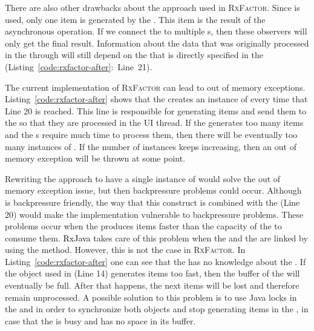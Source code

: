 \documentclass[type=bsc,accentcolor=tud9c]{tudthesis}
\newcommand{\framework}[1]{\textcolor{black}{#1}}
\begin{document}
There are also other drawbacks about the approach used in \textsc{RxFactor}. Since  is used, only one item is generated by the . This item is the result of the asynchronous operation. If we connect the  to multiple s, then these observers will only get the final result. Information about the data that was originally processed in the  through  will still depend on the  that is directly specified in the  (Listing~\ref{code:rxfactor-after}:~Line~21).

The current implementation of \textsc{RxFactor} can lead to out of memory exceptions. Listing~\ref{code:rxfactor-after} shows that the  creates an instance of  every time that Line 20 is reached. This line is responsible for generating items and send them to the  so that they are processed in the UI thread. If the  generates too many items and the s require much time to process them, then there will be eventually too many instances of . If the number of instances keeps increasing, then an out of memory exception will be thrown at some point. 

Rewriting the approach to have a single instance of  would solve the out of memory exception issue, but then backpressure problems could occur. Although  is backpressure friendly, the way that this construct is combined with the  (Line 20) would make the implementation vulnerable to backpressure problems. These problems occur when the  produces items faster than the capacity of the  to consume them. \framework{RxJava} takes care of this problem when the  and the  are linked by using the  method. However, this is not the case in \textsc{RxFactor}. In Listing~\ref{code:rxfactor-after} one can see that the  has no knowledge about the . If the  object used in  (Line 14) generates items too fast, then the buffer of the  will eventually be full. After that happens, the next items will be lost and therefore remain unprocessed. A possible solution to this problem is to use Java locks in the  and  in order to synchronize both objects and stop generating items in the , in case that the  is busy and has no space in its buffer. 
\end{document}
